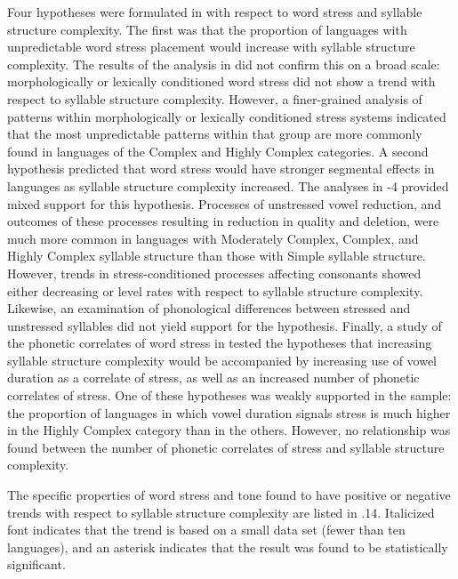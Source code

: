   Four hypotheses were formulated in  with respect to word stress and syllable structure complexity. The first was that the proportion of languages with unpredictable word stress placement would increase with syllable structure complexity. The results of the analysis in  did not confirm this on a broad scale: morphologically or lexically conditioned word stress did not show a trend with respect to syllable structure complexity. However, a finer-grained analysis of patterns within morphologically or lexically conditioned stress systems indicated that the most unpredictable patterns within that group are more commonly found in languages of the Complex and Highly Complex categories. A second hypothesis predicted that word stress would have stronger segmental effects in languages as syllable structure complexity increased. The analyses in -4 provided mixed support for this hypothesis. Processes of unstressed vowel reduction, and outcomes of these processes resulting in reduction in quality and deletion, were much more common in languages with Moderately Complex, Complex, and Highly Complex syllable structure than those with Simple syllable structure. However, trends in stress-conditioned processes affecting consonants showed either decreasing or level rates with respect to syllable structure complexity. Likewise, an examination of phonological differences between stressed and unstressed syllables did not yield support for the hypothesis. Finally, a study of the phonetic correlates of word stress in  tested the hypotheses that increasing syllable structure complexity would be accompanied by increasing use of vowel duration as a correlate of stress, as well as an increased number of phonetic correlates of stress. One of these hypotheses was weakly supported in the sample: the proportion of languages in which vowel duration signals stress is much higher in the Highly Complex category than in the others. However, no relationship was found between the number of phonetic correlates of stress and syllable structure complexity.



  The specific properties of word stress and tone found to have positive or negative trends with respect to syllable structure complexity are listed in .14. Italicized font indicates that the trend is based on a small data set (fewer than ten languages), and an asterisk indicates that the result was found to be statistically significant.






